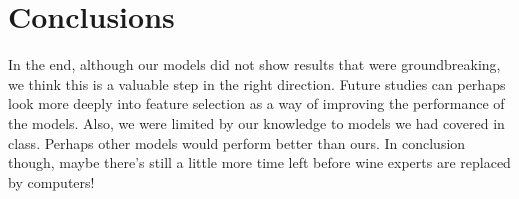
\section{Conclusions}
\label{sec:concl}

In the end, although our models did not show results that were groundbreaking, we think this is a valuable step in the right direction. Future studies can perhaps look more deeply into feature selection as a way of improving the performance of the models. Also, we were limited by our knowledge to models we had covered in class. Perhaps other models would perform better than ours. In conclusion though, maybe there's still a little more time left before wine experts are replaced by computers!
